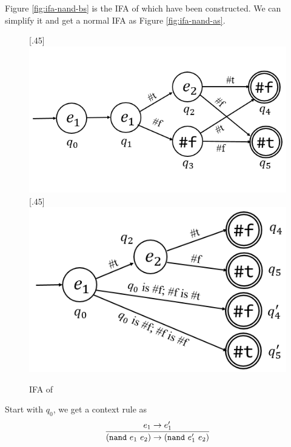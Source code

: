 \begin{example}
    \label{ex:nand}
    Figure \ref{fig:ifa-nand-bs} is the IFA of  which have been constructed. We can simplify it and get a normal IFA as Figure \ref{fig:ifa-nand-as}.

    \begin{figure}[t]
        \centering
        [.45\linewidth]{
            \includegraphics[scale=0.28]{images/ifa/ifa-nand-4.png}
        }
        [.45\linewidth]{
            \includegraphics[scale=0.28]{images/ifa/ifa-nand.png}
        }
        \caption{IFA of }
        \label{fig:ifa-nand-std}
    \end{figure}

    Start with $q_0$, we get a context rule as
    \[
        \infer{(\m{nand}~e_1~e_2) \to (\m{nand}~e_1'~e_2)}{e_1 \to e_1'}
    \]


\end{example}
